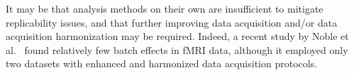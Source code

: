 \documentclass[11pt]{article}
\begin{document}


It may be that analysis methods on their own are insufficient to mitigate replicability issues, and that further improving data acquisition and/or data acquisition harmonization may be required. Indeed, a recent study by Noble et al.~\cite{Noble2017} found relatively few batch effects in fMRI data, although it employed only two datasets with enhanced and harmonized data acquisition protocols. 



\end{document}
